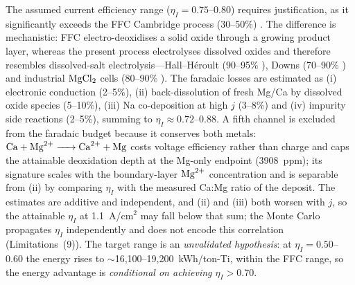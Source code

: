 \documentclass[pdflatex,sn-basic,Numbered]{sn-jnl}
\begin{document}
The assumed current efficiency range ($\eta_I = 0.75$--0.80) requires justification, as it significantly exceeds the FFC Cambridge process (30--50\%) \cite{fray2000}. The difference is mechanistic: FFC electro-deoxidises a solid oxide through a growing product layer, whereas the present process electrolyses dissolved oxides and therefore resembles dissolved-salt electrolysis---Hall--H\'eroult (90--95\% \cite{kvande2014}), Downs (70--90\% \cite{pletcher1990}) and industrial $\ce{MgCl2}$ cells (80--90\% \cite{ji2026,pletcher1990}). The faradaic losses are estimated as (i) electronic conduction (2--5\%), (ii) back-dissolution of fresh Mg/Ca by dissolved oxide species (5--10\%), (iii) Na co-deposition at high $j$ (3--8\%) and (iv) impurity side reactions (2--5\%), summing to $\eta_I \approx 0.72$--0.88. A fifth channel is excluded from the faradaic budget because it conserves both metals: $\ce{Ca + Mg^{2+} -> Ca^{2+} + Mg}$ costs voltage efficiency rather than charge and caps the attainable deoxidation depth at the Mg-only endpoint (3908~ppm); its signature scales with the boundary-layer $\ce{Mg^{2+}}$ concentration and is separable from (ii) by comparing $\eta_I$ with the measured Ca:Mg ratio of the deposit. The estimates are additive and independent, and (ii) and (iii) both worsen with $j$, so the attainable $\eta_I$ at 1.1~A/cm$^2$ may fall below that sum; the Monte Carlo propagates $\eta_I$ independently and does not encode this correlation (Limitations~(9)). The target range is an \emph{unvalidated hypothesis}: at $\eta_I = 0.50$--0.60 the energy rises to $\sim$16{,}100--19{,}200~kWh/ton-Ti, within the FFC range, so the energy advantage is \emph{conditional on achieving $\eta_I > 0.70$}.
\end{document}
